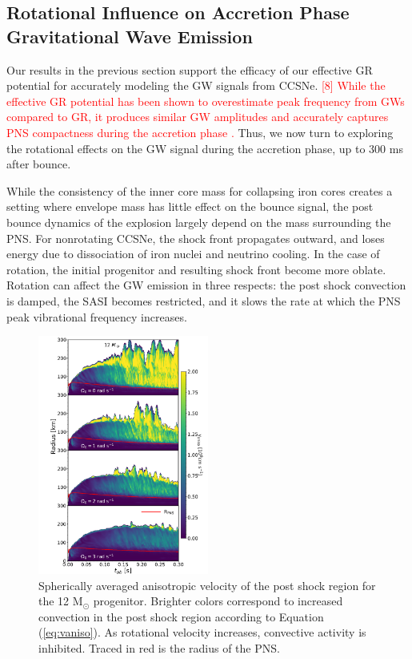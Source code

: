 \documentclass[twocolumn,times]{aastex62}  %
\newcommand{\Msun}{\ensuremath{\mathrm{M}_\odot}\xspace}
\begin{document}
\subsection{Rotational Influence on Accretion Phase Gravitational Wave Emission}

Our results in the previous section support the efficacy of our effective GR potential for accurately modeling the GW signals from CCSNe. \textcolor{red}{[8]  While the effective GR potential has been shown to overestimate peak frequency from GWs compared to GR, it produces similar GW amplitudes and accurately captures PNS compactness during the accretion phase \citep{muller:2013}.}  Thus, we now turn to exploring the rotational effects on the GW signal during the accretion phase, up to 300 ms after bounce.

While the consistency of the inner core mass for collapsing iron cores creates a setting where envelope mass has little effect on the bounce signal, the post bounce dynamics of the explosion largely depend on the mass surrounding the PNS.  For nonrotating CCSNe, the shock front propagates outward, and loses energy due to dissociation of iron nuclei and neutrino cooling.  In the case of rotation, the initial progenitor and resulting shock front become more oblate.  Rotation can affect the GW emission in three respects: the post shock convection is damped, the SASI becomes restricted, and it slows the rate at which the PNS peak vibrational frequency increases.

\begin{figure}[]
    \centering
    \includegraphics[width=0.5\textwidth]{vaniso_rad.pdf}
    \caption{Spherically averaged anisotropic velocity of the post shock region for the 12 \Msun progenitor.  Brighter colors correspond to increased convection in the post shock region according to Equation (\ref{eq:vaniso}).  As rotational velocity increases, convective activity is inhibited.  Traced in red is the radius of the PNS.}
    \label{fig:vaniso}
\end{figure}
\end{document}
